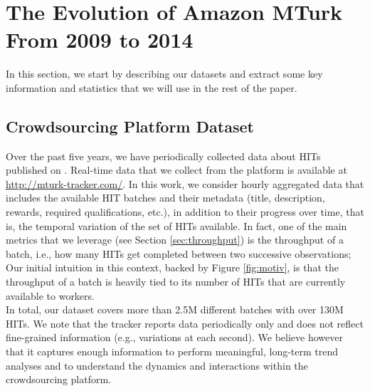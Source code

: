 \section{The Evolution of Amazon MTurk\\ From 2009 to 2014}
\label{sec:stats}

In this section, we start by describing our datasets and extract some key information and statistics that we will use in the rest of the paper.

\subsection{Crowdsourcing Platform Dataset}
\label{sec:tracker}
Over the past five years, we have periodically collected data about HITs published on \amt{}.
Real-time data that we collect from the platform is available at \url{http://mturk-tracker.com/}. In this work, we consider hourly aggregated data that includes the available HIT batches and their metadata (title, description, rewards, required qualifications, etc.), in addition to their progress over time, that is, the temporal variation of the set of HITs available. In fact, one of the main metrics that we leverage (see Section \ref{sec:throughput}) is the throughput of a batch, i.e., how many HITs  get completed between two successive observations; Our initial intuition in this context, backed by Figure \ref{fig:motiv}, is that the throughput of a batch is heavily tied to its number of HITs that are currently available to workers.\\
In total, our dataset covers more than 2.5M different batches with over 130M HITs.
We note that the tracker reports data periodically only and does not reflect fine-grained information (e.g., variations at each second). We believe however that it captures enough information to perform meaningful, long-term trend analyses and to understand the dynamics and interactions within the crowdsourcing platform.\\

